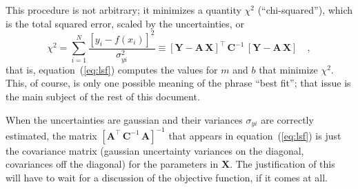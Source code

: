 \documentclass[12pt,twoside]{article}
\newcommand{\documentname}{document}
\newcommand{\equationname}{equation}
\newcommand{\mmatrix}[1]{\boldsymbol{#1}}
\newcommand{\inverse}[1]{{#1}^{-1}}
\newcommand{\transpose}[1]{{#1}^{\scriptscriptstyle \top}}
\newcommand{\mA}{\mmatrix{A}}
\newcommand{\mAT}{\transpose{\mA}}
\newcommand{\mC}{\mmatrix{C}}
\newcommand{\mCinv}{\inverse{\mC}}
\newcommand{\mX}{\mmatrix{X}}
\newcommand{\mY}{\mmatrix{Y}}
\begin{document}
This procedure is not arbitrary; it minimizes a quantity $\chi^2$
(``chi-squared''), which is the total squared error, scaled by the
uncertainties, or
\begin{equation}\label{eq:chisquared}
\chi^2
 = \sum_{i=1}^N \frac{\left[y_i - f(x_i)\right]^2}{\sigma_{yi}^2}
 \equiv \transpose{\left[\mY-\mA\,\mX\right]}
 \,\mCinv\,\left[\mY-\mA\,\mX\right]
 \quad ,
\end{equation}
that is, \equationname~(\ref{eq:lsf}) computes the values for $m$ and
$b$ that minimize $\chi^2$.  This, of course, is only one possible
meaning of the phrase ``best fit''; that issue is the main subject of
the rest of this \documentname.

When the uncertainties are gaussian and their variances $\sigma_{yi}$
are correctly estimated, the matrix
$\inverse{\left[\mAT\,\mCinv\,\mA\right]}$ that appears in
\equationname~(\ref{eq:lsf}) is just the covariance matrix (gaussian
uncertainty variances on the diagonal, covariances off the diagonal)
for the parameters in $\mX$.  The justification of this will have to
wait for a discussion of the objective function, if it comes at all.
\end{document}
